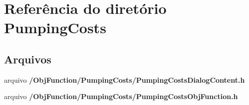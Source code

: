 \section{Referência do diretório Pumping\+Costs}
\label{dir_86d77426e0e5c676f0fcd4435dda1c01}
\subsection*{Arquivos}
\begin{DoxyCompactItemize}
\item 
arquivo {\bf /\+Obj\+Function/\+Pumping\+Costs/\+Pumping\+Costs\+Dialog\+Content.\+h}
\item 
arquivo {\bf /\+Obj\+Function/\+Pumping\+Costs/\+Pumping\+Costs\+Obj\+Function.\+h}
\end{DoxyCompactItemize}
